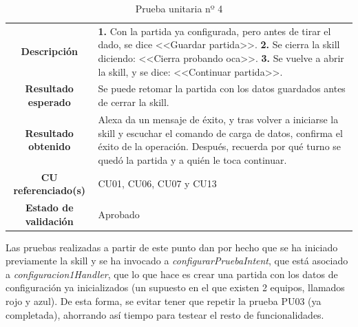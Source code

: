 \begin{table}[H]
	\centering
	\begin{tabular}{|c|p{8.5cm}|}
		\hline
		\rowcolor{lightgray}
		\multicolumn{2}{|c|}{\textbf{PU04}: Guardar y cargar la partida} \\
		\hline
		\textbf{Descripción} & 
		\textbf{1.} Con la partida ya configurada, pero antes de tirar el dado, se dice <<Guardar partida>>. \newline
		\vspace{0.2cm}
		\textbf{2.} Se cierra la skill diciendo: <<Cierra probando oca>>. \newline
		\vspace{0.2cm}
		\textbf{3.} Se vuelve a abrir la skill, y se dice: <<Continuar partida>>. \newline
		\vspace{0.2cm} \\
		\hline
		\textbf{Resultado esperado} & Se puede retomar la partida con los datos guardados antes de cerrar la skill.  \vspace{0.2cm} \\
		\hline
		\textbf{Resultado obtenido} & Alexa da un mensaje de éxito, y tras volver a iniciarse la skill y escuchar el comando de carga de datos, confirma el éxito de la operación. Después, recuerda por qué turno se quedó la partida y a quién le toca continuar. \vspace{0.2cm} \\
		\hline
		\textbf{CU referenciado(s)} & CU01, CU06, CU07 y CU13 \vspace{0.2cm} \\
		\hline
		\textbf{Estado de validación} & Aprobado \vspace{0.2cm} \\
		\hline
	\end{tabular}
	\caption{Prueba unitaria nº 4}
	\label{tab:PU04}
\end{table}

Las pruebas realizadas a partir de este punto dan por hecho que se ha iniciado previamente la skill y se ha invocado a \textit{configurarPruebaIntent}, que está asociado a \textit{configuracion1Handler}, que lo que hace es crear una partida con los datos de configuración ya inicializados (un supuesto en el que existen 2 equipos, llamados rojo y azul). 
De esta forma, se evitar tener que repetir la prueba PU03 (ya completada), ahorrando así tiempo para testear el resto de funcionalidades.

